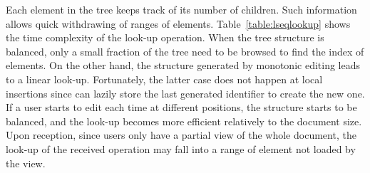 Each element in the tree keeps track of its number of children. Such information
allows quick withdrawing of ranges of elements. Table~\ref{table:lseqlookup}
shows the time complexity of the look-up operation. When the tree structure is
balanced, only a small fraction of the tree need to be browsed to find the index
of elements. On the other hand, the structure generated by monotonic editing
leads to a linear look-up. Fortunately, the latter case does not happen at local
insertions since \CRATE can lazily store the last generated identifier to create
the new one. If a user starts to edit each time at different positions, the
structure starts to be balanced, and the look-up becomes more efficient
relatively to the document size. Upon reception, since users only have a partial
view of the whole document, the look-up of the received operation may fall into
a range of element not loaded by the view.


